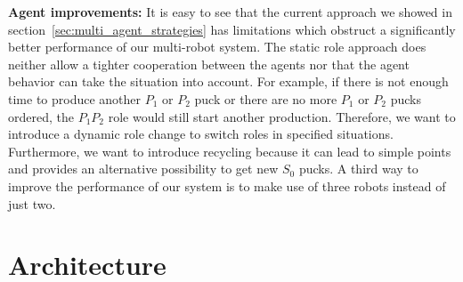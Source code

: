 \textbf{Agent improvements:} It is easy to see that the current approach we showed in section~\ref{sec:multi_agent_strategies} has limitations which obstruct a significantly better performance of our multi-robot system. The static role approach does neither allow a tighter cooperation between the agents nor that the agent behavior can take the situation into account. For example, if there is not enough time to produce another $P_1$ or $P_2$ puck or there are no more $P_1$ or $P_2$ pucks ordered, the $P_1P_2$ role would still start another production. Therefore, we want to introduce a dynamic role change to switch roles in specified situations. Furthermore, we want to introduce recycling because it can lead to simple points and provides an alternative possibility to get new $S_0$ pucks. A third way to improve the performance of our system is to make use of three robots instead of just two.\\


\section{Architecture}
\label{sec:architecture}

